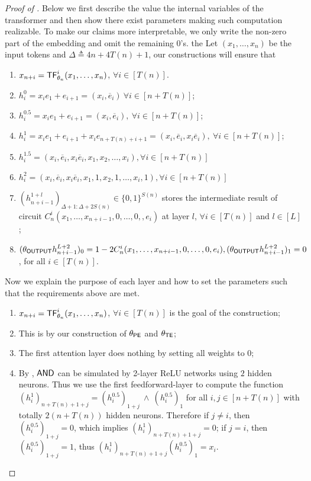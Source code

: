 \begin{proof}[Proof of ]
Below we first describe the value the internal variables of the transformer and then show there exist parameters making such computation realizable. To make our claims more interpretable, we only write the non-zero part of the embedding and omit the remaining $0$'s.  the Let $(x_1,\ldots, x_n)$ be the input tokens and $\Delta\triangleq 4n+4T(n)+1$, our constructions will ensure that 
	\begin{enumerate}
		\item $x_{n+i}= \mathsf{TF}^i_{\theta_n}(x_1,\ldots,x_n)$,  $\forall i\in[T(n)]$. 
		\item $h^0_{i}= x_i e_1 + e_{i+1} = (x_i, \overline e_i) \  \forall i \in [ n+T(n)]$;
		\item $h^{0.5}_{i}\!= x_i e_1 + e_{i+1} = (x_i, \overline e_i), \  \forall i \in [ n+T(n)]$;
		\item $h^{1}_{i} = x_i e_1 + e_{i+1} + x_ie_{n+T(n)+i+1} = (x_i, \overline e_i, x_i \overline e_i), \  \forall i \in [ n+T(n)]$;
		\item $h^{1.5}_{i} =  (x_i, \overline e_i, x_i \overline e_i, x_1,x_2,\ldots,x_i), \forall i \in [ n+ T(n)]$
		\item $h^{2}_{i} =  (x_i, \overline e_i, x_i \overline e_i, x_1,1,x_2,1,\ldots,x_i,1), \forall i \in [ n+ T(n)]$
		\item $(h^{1+l}_{n+i-1})_{\Delta+1: \Delta+ 2S(n) }\in\{0,1\}^{S(n)}$ stores the intermediate result of circuit $C_n^{i}(x_1,\ldots,x_{n+i-1}, 0,\ldots, 0,,e_i)$ at layer $l$, $\forall i\in[T(n)]$ and $l\in [L]$;
		\item $(\theta_{\mathsf{OUTPUT}} h^{L+2}_{n+i-1})_0 = 1-2C_n^{i}(x_1,\ldots,x_{n+i-1}, 0,\ldots, 0,e_i), (\theta_{\mathsf{OUTPUT}} h^{L+2}_{n+i-1})_1 =0$, for all $i\in[T(n)]$.
	\end{enumerate} 
	
	
	Now we explain the purpose of each layer and how to set the parameters such that the requirements above are met.
	\begin{enumerate}
		\item $x_{n+i}= \mathsf{TF}^i_{\theta_n}(x_1,\ldots,x_n)$,  $\forall i\in[T(n)]$ is the goal of the construction;
		\item This is by our construction of $\theta_{\mathsf{PE}}$ and $\theta_{\mathsf{TE}}$;
		\item The first attention layer does nothing by setting all weights to $0$;
		\item By , $\mathsf{AND}$ can be simulated by 2-layer ReLU networks using $2$ hidden neurons.  Thus we use the first feedforward-layer to compute the function $(h_i^1)_{n+T(n)+1+j} =  (h_i^{0.5})_{1+j}\  \wedge \ (h_i^{0.5})_{1}$ for all $i,j\in[n+T(n)]$ with totally $2(n+T(n))$ hidden neurons. Therefore if $j\neq i$, then $ (h_i^{0.5})_{1+j} = 0$, which implies $(h_i^1)_{n+T(n)+1+j}  = 0$; if $j=i$, then $(h_i^{0.5})_{1+j} = 1$, thus $(h_i^1)_{n+T(n)+1+j}(h_i^{0.5})_{1} = x_i$. 


\end{enumerate}
\end{proof}
